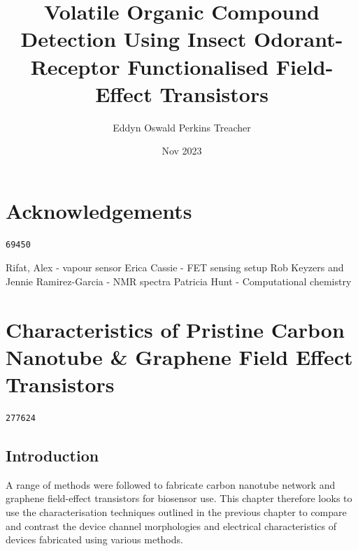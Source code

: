 \documentclass[
  a4paper,
]{scrbook}
\title{Volatile Organic Compound Detection Using Insect Odorant-Receptor
Functionalised Field-Effect Transistors}
\author{Eddyn Oswald Perkins Treacher}
\date{Nov 2023}
\renewcommand*\contentsname{Table of contents}
\newcommand\contentsname{Table of contents}
\begin{document}
\frontmatter
\maketitle
\ifdefined\Shaded\renewenvironment{Shaded}{\begin{tcolorbox}[frame hidden, boxrule=0pt, interior hidden, enhanced, borderline west={3pt}{0pt}{shadecolor}, sharp corners, breakable]}{\end{tcolorbox}}\fi

\renewcommand*\contentsname{Table of contents}
{
\setcounter{tocdepth}{2}
\tableofcontents
}
\mainmatter
{}

\hypertarget{acknowledgements}{%
\chapter*{Acknowledgements}\label{acknowledgements}}


\begin{verbatim}
69450
\end{verbatim}

Rifat, Alex - vapour sensor Erica Cassie - FET sensing setup Rob Keyzers
and Jennie Ramirez-Garcia - NMR spectra Patricia Hunt - Computational
chemistry


\hypertarget{characteristics-of-pristine-carbon-nanotube-graphene-field-effect-transistors}{%
\chapter{Characteristics of Pristine Carbon Nanotube \& Graphene Field
Effect
Transistors}\label{characteristics-of-pristine-carbon-nanotube-graphene-field-effect-transistors}}

\begin{verbatim}
277624
\end{verbatim}

\hypertarget{introduction}{%
\section{Introduction}\label{introduction}}

A range of methods were followed to fabricate carbon nanotube network
and graphene field-effect transistors for biosensor use. This chapter
therefore looks to use the characterisation techniques outlined in the
previous chapter to compare and contrast the device channel morphologies
and electrical characteristics of devices fabricated using various
methods.
\end{document}
